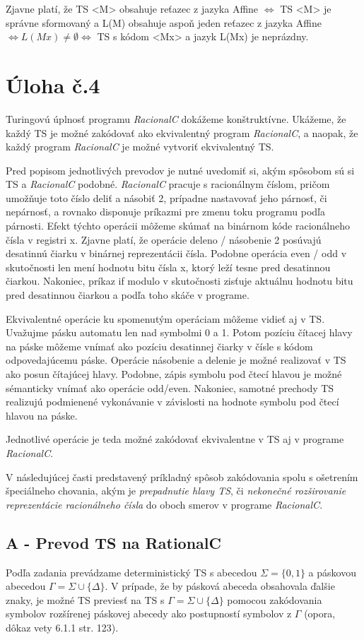 \documentclass[10pt]{article}
\begin{document}
Zjavne platí, že TS <M> obsahuje reťazec z jazyka Affine $\iff$ TS <M> je správne sformovaný a L(M)
obsahuje aspoň jeden reťazec z jazyka Affine $\iff L(Mx) \neq \emptyset \iff$ TS s kódom <Mx> a
jazyk L(Mx) je neprázdny.

\section*{Úloha č.4}
Turingovú úplnosť programu \textit{RacionalC} dokážeme konštruktívne. Ukážeme, že každý TS je možné
zakódovať ako ekvivalentný program \textit{RacionalC}, a naopak, že každý program \textit{RacionalC}
je možné vytvoriť ekvivalentný TS.

Pred popisom jednotlivých prevodov je nutné uvedomiť si, akým spôsobom sú si TS a
\textit{RacionalC} podobné. \textit{RacionalC} pracuje s racionálnym číslom, pričom umožňuje toto číslo deliť a násobiť 2,
prípadne nastavovať jeho párnosť, či nepárnosť, a rovnako disponuje príkazmi pre zmenu toku programu
podľa párnosti. 
Efekt týchto operácii môžeme skúmať na binárnom kóde racionálneho čísla v registri x.
Zjavne platí, že operácie deleno / násobenie 2 posúvajú desatinnú čiarku v binárnej reprezentácii
čísla. Podobne operácia even / odd v skutočnosti len mení hodnotu bitu čísla x, ktorý leží tesne
pred desatinnou čiarkou. Nakoniec, príkaz if modulo v skutočnosti zisťuje aktuálnu hodnotu bitu
pred desatinnou čiarkou a podľa toho skáče v programe.

Ekvivalentné operácie ku spomenutým operáciam môžeme vidieť aj v TS. Uvažujme pásku automatu len nad
symbolmi 0 a 1. Potom pozíciu čítacej hlavy na páske
môžeme vnímať ako pozíciu desatinnej čiarky v čísle s kódom odpovedajúcemu páske.
Operácie násobenie a delenie je možné realizovať v TS ako posun čítajúcej hlavy.
Podobne, zápis symbolu pod čtecí hlavou je možné sémanticky vnímať ako operácie odd/even.
Nakoniec, samotné prechody TS realizujú podmienené vykonávanie v závislosti na hodnote symbolu pod
čtecí hlavou na páske.

Jednotlivé operácie je teda možné zakódovať ekvivalentne v TS aj v programe \textit{RacionalC}.

V následujúcej časti predstavený príkladný spôsob zakódovania spolu s ošetrením špeciálneho
chovania, akým je \textit{prepadnutie hlavy TS}, či \textit{nekonečné rozširovanie reprezentácie
racionálneho čísla}
do oboch smerov v programe \textit{RacionalC}.

\subsection*{A - Prevod TS na RationalC}
Podľa zadania prevádzame deterministický TS s abecedou $\Sigma = \{0,1\}$ a páskovou abecedou 
$\Gamma = \Sigma \cup \{\Delta\}$. V prípade, že by pásková abeceda obsahovala ďalšie znaky, je možné 
TS previesť na TS s $\Gamma = \Sigma \cup \{\Delta\}$ pomocou zakódovania symbolov rozšírenej páskovej abecedy
ako postupností symbolov z $\Gamma$ (opora, dôkaz vety 6.1.1 str. 123).
\end{document}
